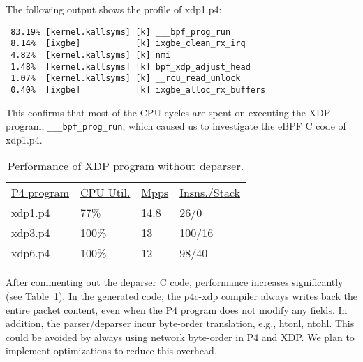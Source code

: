 \noindent The following output shows the profile of xdp1.p4:
{\scriptsize
\begin{verbatim}
 83.19% [kernel.kallsyms] [k] ___bpf_prog_run
 8.14%  [ixgbe]           [k] ixgbe_clean_rx_irq
 4.82%  [kernel.kallsyms] [k] nmi
 1.48%  [kernel.kallsyms] [k] bpf_xdp_adjust_head
 1.07%  [kernel.kallsyms] [k] __rcu_read_unlock
 0.40%  [ixgbe]           [k] ixgbe_alloc_rx_buffers
\end{verbatim}
}

This confirms that most of the CPU cycles are spent on executing the
XDP program, \texttt{\_\_\_bpf\_prog\_run}, which caused us to investigate the 
eBPF C code of xdp1.p4.

\begin{table}
\centering
\small
\begin{tabular}{llll}
  \underline{P4 program} & \underline{CPU Util.} & \underline{Mpps} & \underline{Insns./Stack}\\
  xdp1.p4 &  77\% &  14.8 & 26/0 \\
  xdp3.p4 &  100\% &  13 & 100/16 \\
  xdp6.p4 &  100\% &  12 & 98/40 \\
\end{tabular}
\caption{\footnotesize Performance of XDP program without deparser.}
\label{tab:perf2}
\end{table}

After commenting out the deparser C code, performance increases
significantly (see Table~\ref{tab:perf2}).  In the generated
code, the p4c-xdp compiler always writes back the entire packet
content, even when the P4 program does not modify any fields.  In
addition, the parser/deparser incur byte-order translation, e.g.,
htonl, ntohl.  This could be avoided by always using network
byte-order in P4 and XDP.  We plan to implement optimizations to
reduce this overhead.

